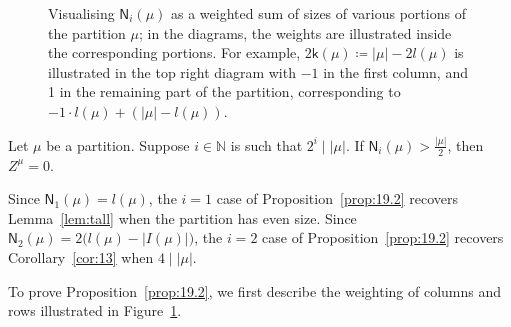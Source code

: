 \documentclass[ALCO, Unicode]{cedram}
\newcommand{\sk}{\mathsf{k}}
\newcommand{\sn}{\mathsf{N}}
\newcommand{\N}{\mathbb{N}}
\begin{document}
\begin{figure}
	\caption{Visualising $\sn_i(\mu)$ as a weighted sum of sizes of various portions of the partition $\mu$; in the diagrams, the weights are illustrated inside the corresponding portions. For example, $2\sk(\mu)\coloneqq |\mu|-2l(\mu)$ is illustrated in the top right diagram with $-1$ in the first column, and 1 in the remaining part of the partition, corresponding to $-1\cdot l(\mu) + (|\mu|-l(\mu))$.}
	\label{fig:stats}
\end{figure}

\begin{proposition}\label{prop:19.2}
	Let $\mu$ be a partition. Suppose $i\in\N$ is such that $2^i\mid |\mu|$. If $\sn_i(\mu)>\frac{|\mu|}{2}$, then $Z^\mu=0$.
\end{proposition}

\begin{remark}
	Since $\sn_1(\mu)=l(\mu)$, the $i=1$ case of Proposition~\ref{prop:19.2} recovers Lemma~\ref{lem:tall} when the partition has even size. Since $\sn_2(\mu) = 2\big(l(\mu)-|I(\mu)|\big)$, the $i=2$ case of Proposition~\ref{prop:19.2} recovers Corollary~\ref{cor:13} when $4\mid|\mu|$.%
\end{remark}

To prove Proposition~\ref{prop:19.2}, we first describe the weighting of columns and rows illustrated in Figure~\ref{fig:stats}. 
\end{document}
